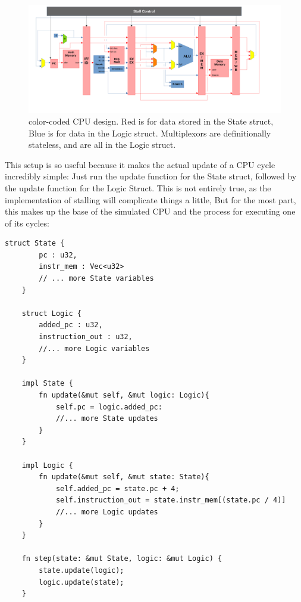 \documentclass[12pt,twoside]{reedthesis}
\begin{document}
\begin{figure}[h!]

	\centering
	\includegraphics[scale=0.4]{cpu_color}
	\caption{color-coded CPU design. Red is for data stored in the State struct, Blue is for data in the Logic struct. Multiplexors are definitionally stateless, and are all in the Logic struct.}
	\label{cpu-color}
\end{figure}


This setup is so useful because it makes the actual update of a CPU cycle incredibly simple: Just run the update function for the State struct, followed by the update function for the Logic Struct. This is not entirely true, as the implementation of stalling will complicate things a little, But for the most part, this makes up the base of the simulated CPU and the process for executing one of its cycles:

\begin{lstlisting}[caption={Barebones layout of $components.rs$}]
	struct State {
		pc : u32,
		instr_mem : Vec<u32>
		// ... more State variables
	}

	struct Logic {
		added_pc : u32,
		instruction_out : u32,
		//... more Logic variables
	}

	impl State {
		fn update(&mut self, &mut logic: Logic){
			self.pc = logic.added_pc:
			//... more State updates
		}
	}

	impl Logic {
		fn update(&mut self, &mut state: State){
			self.added_pc = state.pc + 4;
			self.instruction_out = state.instr_mem[(state.pc / 4)]
			//... more Logic updates
		}
	}

	fn step(state: &mut State, logic: &mut Logic) {
		state.update(logic);
		logic.update(state);
	}
\end{lstlisting}
\end{document}
